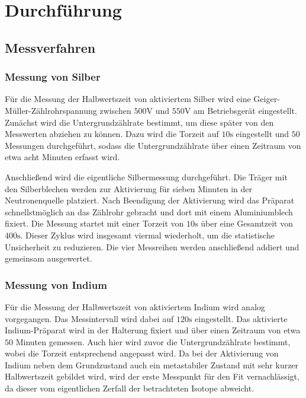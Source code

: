 \chapter{Durchführung} 
\label{ch:Durchfuehrung}

\section{Messverfahren}
\label{sec:Messverfahren}

\subsection{Messung von Silber}

Für die Messung der Halbwertszeit von aktiviertem Silber wird eine Geiger-Müller-Zählrohrspannung zwischen $500\mathrm{V}$ und $550\mathrm{V}$ am Betriebsgerät eingestellt. Zunächst wird die Untergrundzählrate bestimmt, um diese später von den Messwerten abziehen zu können. Dazu wird die Torzeit auf $10\mathrm{s}$ eingestellt und $50$ Messungen durchgeführt, sodass die Untergrundzählrate über einen Zeitraum von etwa acht Minuten erfasst wird.

Anschließend wird die eigentliche Silbermessung durchgeführt. Die Träger mit den Silberblechen werden zur Aktivierung für sieben Minuten in der Neutronenquelle platziert. Nach Beendigung der Aktivierung wird das Präparat schnellstmöglich an das Zählrohr gebracht und dort mit einem Aluminiumblech fixiert. Die Messung startet mit einer Torzeit von $10\mathrm{s}$ über eine Gesamtzeit von $400\mathrm{s}$. Dieser Zyklus wird insgesamt viermal wiederholt, um die statistische Unsicherheit zu reduzieren. Die vier Messreihen werden anschließend addiert und gemeinsam ausgewertet.

\subsection{Messung von Indium}

Für die Messung der Halbwertszeit von aktiviertem Indium wird analog vorgegangen. Das Messintervall wird dabei auf $120\mathrm{s}$ eingestellt. Das aktivierte Indium-Präparat wird in der Halterung fixiert und über einen Zeitraum von etwa $50$ Minuten gemessen. Auch hier wird zuvor die Untergrundzählrate bestimmt, wobei die Torzeit entsprechend angepasst wird. Da bei der Aktivierung von Indium neben dem Grundzustand auch ein metastabiler Zustand mit sehr kurzer Halbwertszeit gebildet wird, wird der erste Messpunkt für den Fit vernachlässigt, da dieser vom eigentlichen Zerfall der betrachteten Isotope abweicht.

